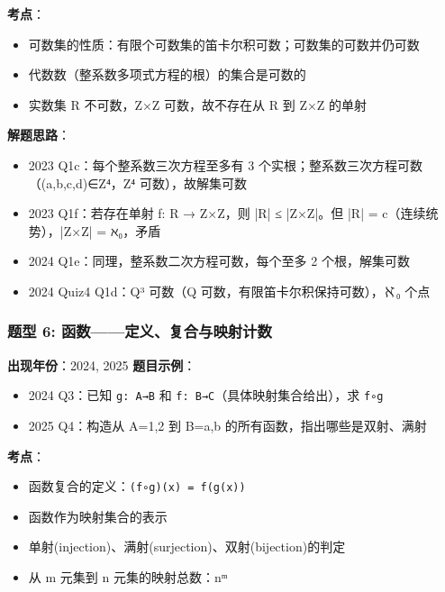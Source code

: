 \documentclass[10pt,a4paper,openany]{ctexbook}
\theoremstyle{definition}
\theoremstyle{remark}
\begin{document}
\textbf{考点}：
\begin{itemize}
\item 可数集的性质：有限个可数集的笛卡尔积可数；可数集的可数并仍可数
\item 代数数（整系数多项式方程的根）的集合是可数的
\item 实数集 R 不可数，Z×Z 可数，故不存在从 R 到 Z×Z 的单射

\end{itemize}

\textbf{解题思路}：
\begin{itemize}
\item 2023 Q1c：每个整系数三次方程至多有 3 个实根；整系数三次方程可数（(a,b,c,d)∈Z⁴，Z⁴ 可数），故解集可数
\item 2023 Q1f：若存在单射 f: R → Z×Z，则 |R| ≤ |Z×Z|。但 |R| = c（连续统势），|Z×Z| = ℵ₀，矛盾
\item 2024 Q1e：同理，整系数二次方程可数，每个至多 2 个根，解集可数
\item 2024 Quiz4 Q1d：Q³ 可数（Q 可数，有限笛卡尔积保持可数），ℵ₀ 个点

\end{itemize}

\vspace{-2pt}

\subsubsection{题型 6: 函数——定义、复合与映射计数}

\textbf{出现年份}：2024, 2025
\textbf{题目示例}：
\begin{itemize}
\item 2024 Q3：已知 \texttt{g: A→B} 和 \texttt{f: B→C}（具体映射集合给出），求 \texttt{f∘g}
\item 2025 Q4：构造从 A={1,2} 到 B={a,b} 的所有函数，指出哪些是双射、满射

\end{itemize}

\textbf{考点}：
\begin{itemize}
\item 函数复合的定义：\texttt{(f∘g)(x) = f(g(x))}
\item 函数作为映射集合的表示
\item 单射(injection)、满射(surjection)、双射(bijection)的判定
\item 从 m 元集到 n 元集的映射总数：nᵐ

\end{itemize}
\end{document}
